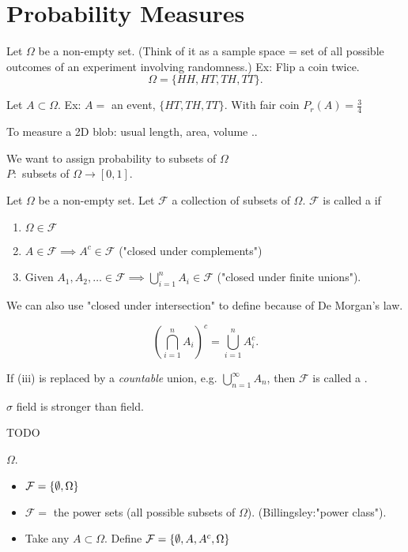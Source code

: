 \documentclass[class=article, crop=false]{standalone}
\begin{document}
\section{Probability Measures}
Let $\Omega$ be a non-empty set. 
(Think of it as a sample space = set of all possible outcomes of an experiment involving randomness.)
Ex: Flip a coin twice.
\[
	\Omega=\{HH,HT,TH,TT\}
.\]

Let $ A \subset \Omega$. 
Ex: $A=$ an event, $\{HT,TH,TT\}$.
With fair coin $P_r (A) = \frac{3}{4}$

To measure a 2D blob: usual length, area, volume ..

We want to assign probability to subsets of $\Omega$\\
$P:$ subsets of  $\Omega \to [0,1]$.

\begin{defn}[field]
	Let $\Omega$ be a non-empty set. Let $\mathcal{F}$ a collection of subsets of $\Omega$. $\mathcal{F}$ is called a  if
	\begin{enumerate}
		\item $\Omega \in \mathcal{F}$
		\item $A\in \mathcal{F} \implies A^{c} \in \mathcal{F} $ ("closed under complements")
		\item Given $A_1,A_2,\ldots \in \mathcal{F} \implies \bigcup_{i= 1}^{ n} A_i \in \mathcal{F}$ ("closed under finite unions"). 
	\end{enumerate}
\end{defn}
\begin{remark}
We can also use "closed under intersection" to define because of De Morgan's law.
\end{remark}
\[
	\left( \bigcap_{i= 1}^{ n} A_i \right)^{c} = \bigcup_{i= 1}^{ n} A_i^{c}
.\] 
\begin{defn}
	If (iii) is replaced by a \emph{countable} union, e.g. $\bigcup_{n= 1}^{\infty} A_n $, then $\mathcal{F}$ is called a .  
\end{defn}
\begin{remark}
$\sigma$ field is stronger than field.
\end{remark}
\begin{eg}
TODO
\end{eg}
$\Omega$.\\

\begin{itemize}
	\item $\mathcal{F}=\{\emptyset,\Omega\}$
	\item $\mathcal{F} =$ the power sets (all possible subsets of $\Omega$). (Billingsley:"power class").
	\item Take any $A\subset \Omega$. Define $\mathcal{F}=\{\emptyset,A,A^{c},\Omega\}$
\end{itemize}
\end{document}
